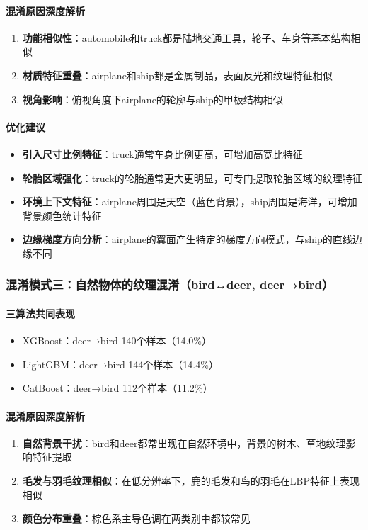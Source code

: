 \documentclass[UTF8]{report}
\theoremstyle{MyLineTheoremStyle} %
\theoremstyle{MyBlockTheoremStyle} %
\theoremstyle{MySubsubsectionStyle} %
\begin{document}
\paragraph{混淆原因深度解析}
\begin{enumerate}
    \item \textbf{功能相似性}：automobile和truck都是陆地交通工具，轮子、车身等基本结构相似
    \item \textbf{材质特征重叠}：airplane和ship都是金属制品，表面反光和纹理特征相似
    \item \textbf{视角影响}：俯视角度下airplane的轮廓与ship的甲板结构相似
\end{enumerate}
\paragraph{优化建议}
\begin{itemize}
    \item \textbf{引入尺寸比例特征}：truck通常车身比例更高，可增加高宽比特征
    \item \textbf{轮胎区域强化}：truck的轮胎通常更大更明显，可专门提取轮胎区域的纹理特征
    \item \textbf{环境上下文特征}：airplane周围是天空（蓝色背景），ship周围是海洋，可增加背景颜色统计特征
    \item \textbf{边缘梯度方向分析}：airplane的翼面产生特定的梯度方向模式，与ship的直线边缘不同
\end{itemize}

\subsubsection{混淆模式三：自然物体的纹理混淆（bird↔deer, deer→bird）}
\paragraph{三算法共同表现}
\begin{itemize}
    \item XGBoost：deer→bird 140个样本（14.0\%）
    \item LightGBM：deer→bird 144个样本（14.4\%）
    \item CatBoost：deer→bird 112个样本（11.2\%）
\end{itemize}
\paragraph{混淆原因深度解析}
\begin{enumerate}
    \item \textbf{自然背景干扰}：bird和deer都常出现在自然环境中，背景的树木、草地纹理影响特征提取
    \item \textbf{毛发与羽毛纹理相似}：在低分辨率下，鹿的毛发和鸟的羽毛在LBP特征上表现相似
    \item \textbf{颜色分布重叠}：棕色系主导色调在两类别中都较常见
\end{enumerate}
\end{document}
